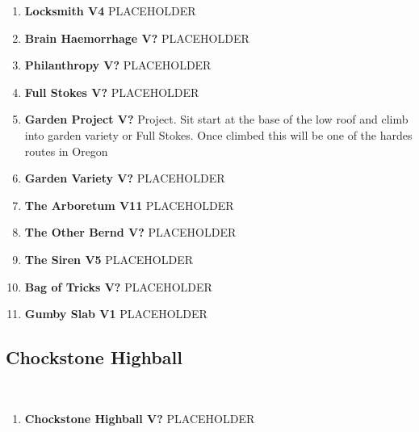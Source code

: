 \begin{enumerate}[resume]
	\item\label{rt:Locksmith} \colorbox{RoyalBlue!20}{\textbf{Locksmith V4       \warn \warn } }
	\newline PLACEHOLDER\
	\item\label{rt:Brain Haemorrhage} \colorbox{black!20}{\textbf{Brain Haemorrhage V?  } }
	\newline PLACEHOLDER\
	\item\label{rt:Philanthropy} \colorbox{black!20}{\textbf{Philanthropy V?  } }
	\newline PLACEHOLDER\
	\item\label{rt:Full Stokes} \colorbox{black!20}{\textbf{Full Stokes V?  } }
	\newline PLACEHOLDER\
	\item\label{rt:Garden Project} \colorbox{black!20}{\textbf{Garden Project V?  } }
	\newline Project. Sit start at the base of the low roof and climb into garden variety or Full Stokes. Once climbed this will be one of the hardes routes in Oregon\
	\item\label{rt:Garden Variety} \colorbox{black!20}{\textbf{Garden Variety V?  } }
	\newline PLACEHOLDER\
	\item\label{rt:The Arboretum} \colorbox{red!20}{\textbf{The Arboretum V11  } }
	\newline PLACEHOLDER\
	\item\label{rt:The Other Bernd} \colorbox{black!20}{\textbf{The Other Bernd V?  } }
	\newline PLACEHOLDER\
	\item\label{rt:The Siren} \colorbox{RoyalBlue!20}{\textbf{The Siren V5       } }
	\newline PLACEHOLDER\
	\item\label{rt:Bag of Tricks} \colorbox{black!20}{\textbf{Bag of Tricks V?  } }
	\newline PLACEHOLDER\
	\item\label{rt:Gumby Slab} \colorbox{green!20}{\textbf{Gumby Slab V1      } }
	\newline PLACEHOLDER\
\end{enumerate}
\subsection*{Chockstone Highball}\label{bf:Chockstone Highball}
\

\begin{enumerate}[resume]
	\item\label{rt:Chockstone Highball} \colorbox{black!20}{\textbf{Chockstone Highball V?  } }
	\newline PLACEHOLDER\
\end{enumerate}
\clearpage